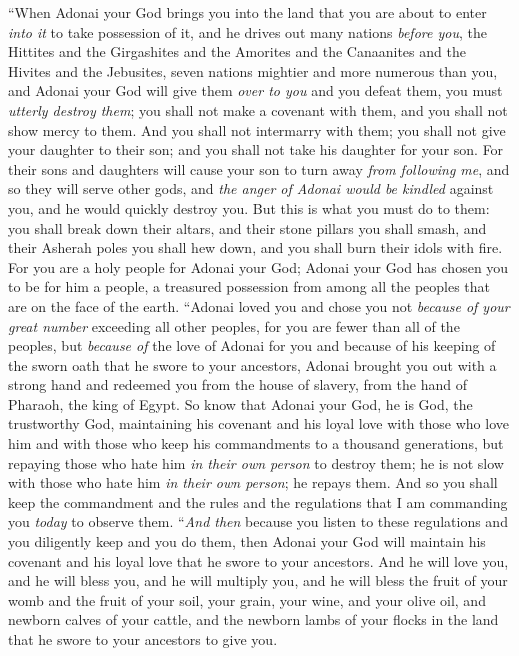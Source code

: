 \begin{biblechapter} %
\verse “When Adonai your God brings you into the land that you are about to enter \textit{into it} to take possession of it, and he drives out many nations \textit{before you}, the Hittites and the Girgashites and the Amorites and the Canaanites and the Hivites and the Jebusites, seven nations mightier and more numerous than you,
\verse and Adonai your God will give them \textit{over to you} and you defeat them, you must \textit{utterly destroy them}; you shall not make a covenant with them, and you shall not show mercy to them.
\verse And you shall not intermarry with them; you shall not give your daughter to their son; and you shall not take his daughter for your son.
\verse For their sons and daughters will cause your son to turn away \textit{from following me}, and so they will serve other gods, and \textit{the anger of Adonai would be kindled} against you, and he would quickly destroy you.
\verse But this is what you must do to them: you shall break down their altars, and their stone pillars you shall smash, and their Asherah poles you shall hew down, and you shall burn their idols with fire.
\verse For you are a holy people for Adonai your God; Adonai your God has chosen you to be for him a people, a treasured possession from among all the peoples that are on the face of the earth.
\verse “Adonai loved you and chose you not \textit{because of your great number} exceeding all other peoples, for you are fewer than all of the peoples,
\verse but \textit{because of} the love of Adonai for you and because of his keeping of the sworn oath that he swore to your ancestors, Adonai brought you out with a strong hand and redeemed you from the house of slavery, from the hand of Pharaoh, the king of Egypt.
\verse So know that Adonai your God, he is God, the trustworthy God, maintaining his covenant and his loyal love with those who love him and with those who keep his commandments to a thousand generations,
\verse but repaying those who hate him \textit{in their own person} to destroy them; he is not slow with those who hate him \textit{in their own person}; he repays them.
\verse And so you shall keep the commandment and the rules and the regulations that I am commanding you \textit{today} to observe them.
\verse “\textit{And then} because you listen to these regulations and you diligently keep and you do them, then Adonai your God will maintain his covenant and his loyal love that he swore to your ancestors.
\verse And he will love you, and he will bless you, and he will multiply you, and he will bless the fruit of your womb and the fruit of your soil, your grain, your wine, and your olive oil, and newborn calves of your cattle, and the newborn lambs of your flocks in the land that he swore to your ancestors to give you.

\end{biblechapter}
